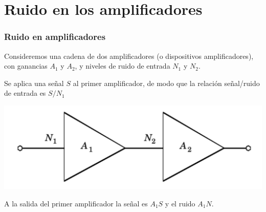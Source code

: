 \documentclass{beamer}
\begin{document}
%
%
%
%
\section{Ruido en los amplificadores} %

\begin{frame}
\frametitle{Ruido en amplificadores}
Consideremos una cadena de dos amplificadores (o dispositivos amplificadores), 
con ganancias $A_1$ y $A_2$, y niveles de ruido de entrada $N_1$ y $N_2$.

Se aplica una señal $S$ al primer amplificador, de modo que la relación 
señal/ruido de entrada es $S/N_1$
\begin{center}
\includegraphics[width=.7\textwidth]{d2/two_amp_snr}
\end{center}
A la salida del primer amplificador la señal es $A_1 S$ y el ruido $A_1 N$.
%
%
\end{frame}
\end{document}
